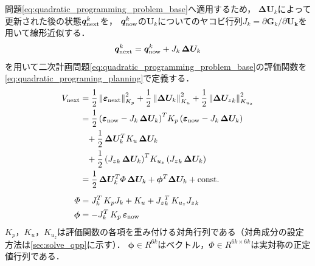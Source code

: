 \documentclass[autodetect-engine,dvipdfmx-if-dvi,ja=standard,a4j,jbase=11pt,magstyle=nomag*]{bxjsreport}
\begin{document}
問題\cref{eq:quadratic_programming_problem_base}へ適用するため，
$\bm{\Delta U}_k$によって更新された後の状態$\bm{q}^k_{\mathrm{next}}$を，
$\bm{q}^k_{\mathrm{now}}$の$\bm{U}_k$についてのヤコビ行列$J_k = \partial \bm{G}_k / \partial \bm{U_k}$を用いて線形近似する．
\begin{equation} \label{eq:q_next}
    \bm{q}^k_{\mathrm{next}} = \bm{q}^k_{\mathrm{now}} + J_k \, \bm{\Delta U}_k
\end{equation}
を用いて二次計画問題\cref{eq:quadratic_programming_problem_base}の評価関数を
\cref{eq:quadratic_programing_planning}で定義する．
\begin{equation}
\label{eq:quadratic_programing_planning}
    \begin{aligned}
        V_{\mathrm{next}} & = \frac{1}{2} \, {\left\| \bm{\varepsilon}_{\mathrm{next}} \right\|}^2_{K_p} + \frac{1}{2} \,{\left\| \bm{\Delta U}_k \right\|}^2_{K_u} + \frac{1}{2} \,{\left\| {\bm{\Delta U}_z}_k \right\|}^2_{K_{u_z}} \\
                  & = \frac{1}{2} \, {\left( \bm{\varepsilon}_{\mathrm{now}} - J_k \, \bm{\Delta U}_k \right)}^T K_p \left( \bm{\varepsilon}_{\mathrm{now}} - J_k \, \bm{\Delta U}_k \right) \\
                  & \phantom{=} + \frac{1}{2} \, \bm{\Delta U}_k^T K_u \, \bm{\Delta U}_k \\
                  & \phantom{=} + \frac{1}{2} \,{\left( {J_z}_k \, \bm{\Delta U}_k \right)}^T K_{u_z} \left( {J_z}_k \, \bm{\Delta U}_k \right) \\
                  & = \frac{1}{2} \, \bm{\Delta U}_k^T \varPhi \, \bm{\Delta U}_k + \bm{\phi}^T \bm{\Delta U}_k + \mathrm{const.} \\[5pt]
        \varPhi   & = J_k^T \, K_p J_k + K_u + {{J_z}_k^T} \, K_{u_z} {J_z}_k \\
        \bm{\phi} & = -J_k^T \, K_p \, \bm{\varepsilon}_{\mathrm{now}}
    \end{aligned}
\end{equation}
$K_p$，$K_u$，$K_{u_z}$は評価関数の各項を重み付ける対角行列である（対角成分の設定方法は\cref{sec:solve_qpp}に示す）．
$\bm{\phi} \in R^{6k}$はベクトル，$\varPhi \in R^{6k \times 6k}$は実対称の正定値行列である．
\end{document}

